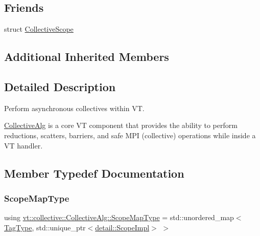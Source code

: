 \subsection*{Friends}
\begin{DoxyCompactItemize}
\item 
struct \hyperlink{structvt_1_1collective_1_1_collective_alg_a915db0886f5b77be011e5a55413319f5}{Collective\+Scope}
\end{DoxyCompactItemize}
\subsection*{Additional Inherited Members}


\subsection{Detailed Description}
Perform asynchronous collectives within VT. 

\hyperlink{structvt_1_1collective_1_1_collective_alg}{Collective\+Alg} is a core VT component that provides the ability to perform reductions, scatters, barriers, and safe M\+PI (collective) operations while inside a VT handler. 

\subsection{Member Typedef Documentation}
\mbox{\label{structvt_1_1collective_1_1_collective_alg_abf644b20fe35cf654f5d4a6702ef5183}} 
\subsubsection{\texorpdfstring{Scope\+Map\+Type}{ScopeMapType}}
{\footnotesize\ttfamily using \hyperlink{structvt_1_1collective_1_1_collective_alg_abf644b20fe35cf654f5d4a6702ef5183}{vt\+::collective\+::\+Collective\+Alg\+::\+Scope\+Map\+Type} =  std\+::unordered\+\_\+map$<$\hyperlink{namespacevt_a84ab281dae04a52a4b243d6bf62d0e52}{Tag\+Type}, std\+::unique\+\_\+ptr$<$\hyperlink{structvt_1_1collective_1_1detail_1_1_scope_impl}{detail\+::\+Scope\+Impl}$>$ $>$\hspace{0.3cm}{\ttfamily [private]}}



